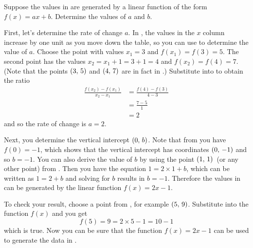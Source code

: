 \documentclass[a4paper,oneside,12pt]{article}
\begin{document}
\begin{table}[!htbp]
\centering

\caption{%
  Some values of a linear function $f(x) = ax + b$.
}
\label{tab:function_values_a_2_b_minus_1}
\end{table}

\begin{example}
Suppose the values in  are
generated by a linear function of the form $f(x) = ax + b$.  Determine
the values of $a$ and $b$.
\end{example}

\begin{solution}
First, let's determine the rate of change $a$.  In
, the values in the $x$
column increase by one unit as you move down the table, so you can
use  to determine the value
of $a$.  Choose the point with values $x_1 = 3$ and
$f(x_1) = f(3) = 5$.  The second point has the values
$x_2 = x_1 + 1 = 3 + 1 = 4$ and $f(x_2) = f(4) = 7$.  (Note that the
points $\left\lparen{3},\, {5}\right\rparen$ and $\left\lparen{4},\, {7}\right\rparen$ are in fact in
.)  Substitute into
 to obtain the ratio
\begin{align*}
\frac{
  f(x_2) - f(x_1)
}{
  x_2 - x_1
}
&=
\frac{
  f(4) - f(3)
}{
  4 - 3
} \\[4pt]
&=
\frac{7 - 5}{1} \\[4pt]
&=
2
\end{align*}
and so the rate of change is $a = 2$.

Next, you determine the vertical intercept $\left\lparen{0},\, {b}\right\rparen$.  Note that
from  you have
$f(0) = -1$, which shows that the vertical intercept has coordinates
$\left\lparen{0},\, {-1}\right\rparen$ and so $b = -1$.  You can also derive the value of $b$
by using the point $\left\lparen{1},\, {1}\right\rparen$~(or any other point) from
.  Then you have the equation
$1 = 2 \times 1 + b$, which can be written as $1 = 2 + b$ and solving
for $b$ results in $b = -1$.  Therefore the values in
 can be generated by the
linear function $f(x) = 2x - 1$.

To check your result, choose a point from
, for example
$\left\lparen{5},\, {9}\right\rparen$.  Substitute into the function $f(x)$ and you get
\[
f(5)
=
9
=
2 \times 5 - 1
=
10 - 1
\]
which is true.  Now you can be sure that the function $f(x) = 2x - 1$
can be used to generate the data in
.
\end{solution}
\end{document}
